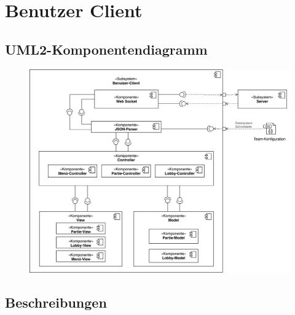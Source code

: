 \section{Benutzer Client}

	\subsection{UML2-Komponentendiagramm}

		\begin{figure}[H]
    		\centering
    		\includegraphics[scale=0.5]{images/komponentendiagramm_benutzer-client.png}
		\end{figure}

	\subsection{Beschreibungen}

